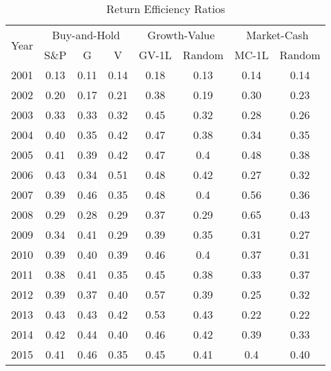 \documentclass{article}
\begin{document}
\newpage
\begin{table}[!ht]
    \centering
    \caption{Return Efficiency Ratios}
    \begin{tabular}{l| ccc||cc||cc}
    \hline
    \multirow{2}{*}{Year} & \multicolumn{3}{c||}{Buy-and-Hold}   
& \multicolumn{2}{c||}{Growth-Value}  &  \multicolumn{2}{c}{Market-Cash}  \\\cline{2-8}
         & S\&P & G  & V & GV-1L& Random  & MC-1L& Random \\ \hline
 2001 & 0.13 & 0.11 & 0.14 & \cellcolor{green!25}0.18 & 0.13 & \cellcolor{green!25}0.14 & 0.14 \\ 
        2002 & 0.20 & 0.17 & 0.21 & \cellcolor{green!25}0.38 & 0.19 & \cellcolor{green!25}0.30 & 0.23 \\ 
        2003 & 0.33 & 0.33 & 0.32 & \cellcolor{green!25}0.45 & 0.32 & \cellcolor{green!25}0.28 & 0.26 \\ 
        2004 & 0.40 & 0.35 & 0.42 & \cellcolor{green!25}0.47 & 0.38 & 0.34 & \cellcolor{green!25}0.35 \\ 
        2005 & 0.41 & 0.39 & 0.42 & \cellcolor{green!25}0.47 & 0.4 & \cellcolor{green!25}0.48 & 0.38 \\ 
        2006 & 0.43 & 0.34 & 0.51 & \cellcolor{green!25}0.48 & 0.42 & 0.27 & \cellcolor{green!25}0.32 \\ 
        2007 & 0.39 & 0.46 & 0.35 & \cellcolor{green!25}0.48 & 0.4 & \cellcolor{green!25}0.56 & 0.36 \\ 
        2008 & 0.29 & 0.28 & 0.29 & \cellcolor{green!25}0.37 & 0.29 & \cellcolor{green!25}0.65 & 0.43 \\ 
        2009 & 0.34 & 0.41 & 0.29 & \cellcolor{green!25}0.39 & 0.35 & \cellcolor{green!25}0.31 & 0.27 \\ 
        2010 & 0.39 & 0.40 & 0.39 & \cellcolor{green!25}0.46 & 0.4 & \cellcolor{green!25}0.37 & 0.31 \\ 
        2011 & 0.38 & 0.41 & 0.35 & \cellcolor{green!25}0.45 & 0.38 & 0.33 & \cellcolor{green!25}0.37 \\ 
        2012 & 0.39 & 0.37 & 0.40 & \cellcolor{green!25}0.57 & 0.39 & 0.25 & \cellcolor{green!25}0.32 \\ 
        2013 & 0.43 & 0.43 & 0.42 & \cellcolor{green!25}0.53 & 0.43 & 0.22 & \cellcolor{green!25}0.22 \\ 
        2014 & 0.42 & 0.44 & 0.40 & \cellcolor{green!25}0.46 & 0.42 & \cellcolor{green!25}0.39 & 0.33 \\ 
        2015 & 0.41 & 0.46 & 0.35 & \cellcolor{green!25}0.45 & 0.41 & 0.4 & \cellcolor{green!25}0.40 \\ 

\end{tabular}
\end{table}
\end{document}
